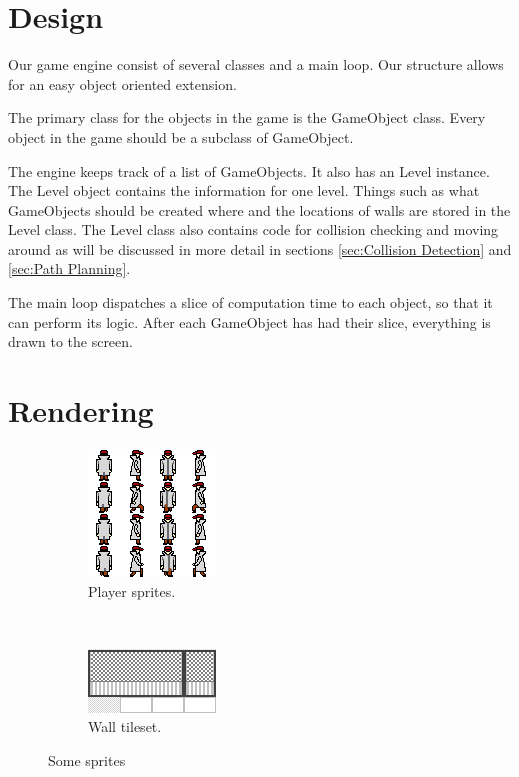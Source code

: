 \documentclass[a4paper,pdf,12pt]{article}
\begin{document}
\section{Design}
\label{sec:Design}

Our game engine consist of several classes and a main loop. Our structure allows for an easy object oriented extension. 

The primary class for the objects in the game is the GameObject class. Every object in the game should be a subclass of GameObject. 

The engine keeps track of a list of GameObjects. It also has an Level instance. The Level object contains the information for one level. Things such as what GameObjects should be created where and the locations of walls are stored in the Level class. The Level class also contains code for collision checking and moving around as will be discussed in more detail in sections \ref{sec:Collision Detection} and \ref{sec:Path Planning}.

The main loop dispatches a slice of computation time to each object, so that it can perform its logic. After each GameObject has had their slice, everything is drawn to the screen.

\section{Rendering}
\label{sec:Rendering}

\begin{figure}
        \centering
        \begin{subfigure}[b]{0.4\textwidth}
                \centering
                \includegraphics{../img/player.png}
                \caption{Player sprites.}
                \label{fig:player}
        \end{subfigure}%
        ~ %
        \begin{subfigure}[b]{0.4\textwidth}
                \centering
                \includegraphics{../img/ground_test.png}
                \caption{Wall tileset.}
                \label{fig:walls}
        \end{subfigure}
        \caption{Some sprites}\label{fig:sprites}
\end{figure}
\end{document}
